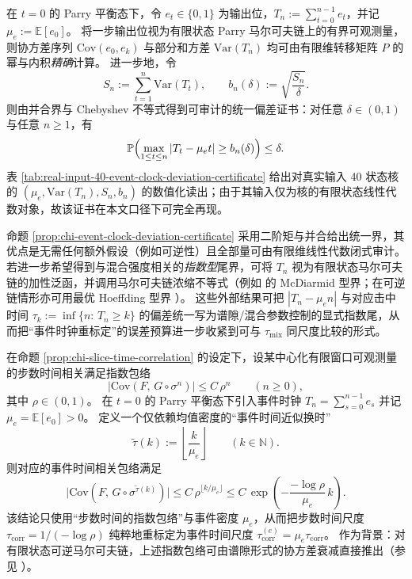 

\begin{remark}\label{prop:chi-event-clock-deviation-certificate}
在 $t=0$ 的 Parry 平衡态下，令 $e_t\in\{0,1\}$ 为输出位，$T_n:=\sum_{t=0}^{n-1}e_t$，并记 $\mu_e:=\mathbb{E}[e_0]$。
将一步输出位视为有限状态 Parry 马尔可夫链上的有界可观测量，则协方差序列
\(
\mathrm{Cov}(e_0,e_k)
\)
与部分和方差
\(
\mathrm{Var}(T_n)
\)
均可由有限维转移矩阵 $P$ 的幂与内积\emph{精确}计算。
进一步地，令
$$
S_n:=\sum_{t=1}^{n}\mathrm{Var}(T_t),\qquad b_n(\delta):=\sqrt{\frac{S_n}{\delta}}.
$$
则由并合界与 Chebyshev 不等式得到可审计的统一偏差证书：对任意 $\delta\in(0,1)$ 与任意 $n\ge 1$，有
$$
\mathbb{P}\Bigl(\max_{1\le t\le n}|T_t-\mu_e t|\ge b_n(\delta)\Bigr)\le \delta.
$$
表 \ref{tab:real-input-40-event-clock-deviation-certificate} 给出对真实输入 40 状态核的 $(\mu_e,\mathrm{Var}(T_n),S_n,b_n)$ 的数值化读出；由于其输入仅为核的有限状态线性代数对象，故该证书在本文口径下可完全再现。
\end{remark}

\begin{remark}[更强指数型证书的外部定理接口]
命题 \ref{prop:chi-event-clock-deviation-certificate} 采用二阶矩与并合给出统一界，其优点是无需任何额外假设（例如可逆性）且全部量可由有限维线性代数闭式审计。
若进一步希望得到与混合强度相关的\emph{指数型}尾界，可将 $T_n$ 视为有限状态马尔可夫链的加性泛函，并调用马尔可夫链浓缩不等式（例如 \cite{Paulin2015MarkovConcentration} 的 McDiarmid 型界；在可逆链情形亦可用最优 Hoeffding 型界 \cite{LeonPerron2004OptimalHoeffding}）。
这些外部结果可把 $|T_n-\mu_e n|$ 与对应击中时间 $\tau_k:=\inf\{n:\,T_n\ge k\}$ 的偏差统一写为谱隙/混合参数控制的显式指数尾，从而把“事件时钟重标定”的误差预算进一步收紧到可与 $\tau_{\mathrm{mix}}$ 同尺度比较的形式。
\end{remark}



\begin{remark}\label{lem:chi-event-time-rescaling}
在命题 \ref{prop:chi-slice-time-correlation} 的设定下，设某中心化有限窗口可观测量的步数时间相关满足指数包络
$$
\bigl|\mathrm{Cov}(F,\,G\circ\sigma^n)\bigr|\le C\,\rho^n\qquad (n\ge 0),
$$
其中 $\rho\in(0,1)$。
在 $t=0$ 的 Parry 平衡态下引入事件时钟 $T_n=\sum_{s=0}^{n-1}e_s$ 并记 $\mu_e=\mathbb{E}[e_0]>0$。
定义一个仅依赖均值密度的“事件时间近似换时”
$$
\widetilde\tau(k):=\left\lfloor\frac{k}{\mu_e}\right\rfloor\qquad (k\in\mathbb{N}).
$$
则对应的事件时间相关包络满足
$$
\bigl|\mathrm{Cov}(F,\,G\circ\sigma^{\widetilde\tau(k)})\bigr|
\le C\,\rho^{\lfloor k/\mu_e\rfloor}
\le C\,\exp\!\left(-\frac{-\log\rho}{\mu_e}\,k\right).
$$
该结论只使用“步数时间的指数包络”与事件密度 $\mu_e$，从而把步数时间尺度 $\tau_{\mathrm{corr}}=1/(-\log\rho)$ 纯粹地重标定为事件时间尺度 $\tau_{\mathrm{corr}}^{(e)}=\mu_e\tau_{\mathrm{corr}}$。
作为背景：对有限状态可逆马尔可夫链，上述指数包络可由谱隙形式的协方差衰减直接推出（参见 \cite[Chapter~12]{LevinPeresWilmer2009MarkovMixing}）。
\end{remark}

